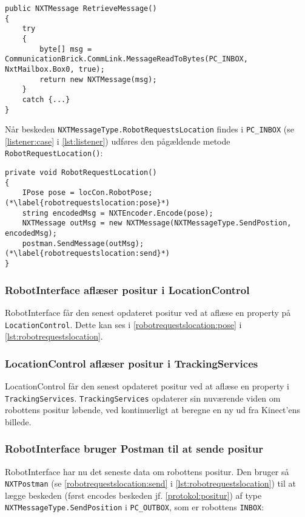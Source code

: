\begin{lstlisting}[style=csharpsmall,label=lst:postman,caption=NXTPostman henter besked fra robot]
public NXTMessage RetrieveMessage()
{
    try
    {
        byte[] msg = CommunicationBrick.CommLink.MessageReadToBytes(PC_INBOX, NxtMailbox.Box0, true);
        return new NXTMessage(msg);
    }
    catch {...}
}
\end{lstlisting}

Når beskeden \lstinline[style=csharp]!NXTMessageType.RobotRequestsLocation! findes i \lstinline[style=csharp]!PC_INBOX! (se \cref{listener:case} i \cref{lst:listener}) udføres den pågældende metode \lstinline[style=csharp]!RobotRequestLocation()!:

\begin{lstlisting}[style=csharpsmall,label=lst:robotrequestslocation,caption=RobotRequestsLocation() i RobotInterface]
private void RobotRequestLocation()
{
    IPose pose = locCon.RobotPose; (*\label{robotrequestslocation:pose}*)
    string encodedMsg = NXTEncoder.Encode(pose);
    NXTMessage outMsg = new NXTMessage(NXTMessageType.SendPostion, encodedMsg);
    postman.SendMessage(outMsg); (*\label{robotrequestslocation:send}*)
}
\end{lstlisting}

\subsubsection{RobotInterface aflæser positur i LocationControl}
RobotInterface får den senest opdateret positur ved at aflæse en property på \lstinline[style=csharp]!LocationControl!.
Dette kan ses i \cref{robotrequestslocation:pose} i \cref{lst:robotrequestslocation}.

\subsubsection{LocationControl aflæser positur i TrackingServices}
LocationControl får den senest opdateret positur ved at aflæse en property i \lstinline[style=csharp]!TrackingServices!.
\lstinline[style=csharp]!TrackingServices! opdaterer sin nuværende viden om robottens positur løbende, ved kontinuerligt at beregne en ny ud fra Kinect'ens billede.

\subsubsection{RobotInterface bruger Postman til at sende positur}
RobotInterface har nu det seneste data om robottens positur.
Den bruger så \lstinline[style=csharp]!NXTPostman! (se \cref{robotrequestslocation:send} i \cref{lst:robotrequestslocation}) til at lægge beskeden (først encodes beskeden jf. \cref{protokol:positur}) af type \lstinline[style=csharp]!NXTMessageType.SendPosition! i \lstinline[style=csharp]!PC_OUTBOX!, som er robottens \lstinline[style=c]!INBOX!:

